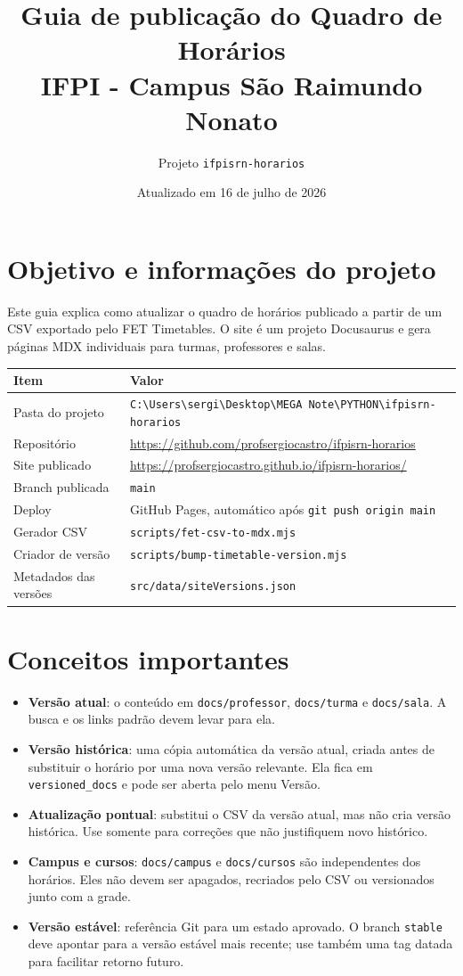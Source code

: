 \documentclass[11pt,a4paper]{article}
\title{\textbf{Guia de publicação do Quadro de Horários}\\\large IFPI - Campus São Raimundo Nonato}
\author{Projeto \texttt{ifpisrn-horarios}}
\date{Atualizado em 16 de julho de 2026}
\begin{document}
\maketitle
\tableofcontents
\newpage

\section{Objetivo e informações do projeto}
Este guia explica como atualizar o quadro de horários publicado a partir de um CSV exportado pelo FET Timetables. O site é um projeto Docusaurus e gera páginas MDX individuais para turmas, professores e salas.

\begin{longtable}{p{}p{}}
\toprule
Item & Valor \\
\midrule
Pasta do projeto & \texttt{C:\textbackslash Users\textbackslash sergi\textbackslash Desktop\textbackslash MEGA Note\textbackslash PYTHON\textbackslash ifpisrn-horarios} \\
Repositório & \url{https://github.com/profsergiocastro/ifpisrn-horarios} \\
Site publicado & \url{https://profsergiocastro.github.io/ifpisrn-horarios/} \\
Branch publicada & \texttt{main} \\
Deploy & GitHub Pages, automático após \texttt{git push origin main} \\
Gerador CSV & \texttt{scripts/fet-csv-to-mdx.mjs} \\
Criador de versão & \texttt{scripts/bump-timetable-version.mjs} \\
Metadados das versões & \texttt{src/data/siteVersions.json} \\
\bottomrule
\end{longtable}

\section{Conceitos importantes}
\begin{itemize}[leftmargin=*]
  \item \textbf{Versão atual}: o conteúdo em \texttt{docs/professor}, \texttt{docs/turma} e \texttt{docs/sala}. A busca e os links padrão devem levar para ela.
  \item \textbf{Versão histórica}: uma cópia automática da versão atual, criada antes de substituir o horário por uma nova versão relevante. Ela fica em \texttt{versioned\_docs} e pode ser aberta pelo menu Versão.
  \item \textbf{Atualização pontual}: substitui o CSV da versão atual, mas não cria versão histórica. Use somente para correções que não justifiquem novo histórico.
  \item \textbf{Campus e cursos}: \texttt{docs/campus} e \texttt{docs/cursos} são independentes dos horários. Eles não devem ser apagados, recriados pelo CSV ou versionados junto com a grade.
  \item \textbf{Versão estável}: referência Git para um estado aprovado. O branch \texttt{stable} deve apontar para a versão estável mais recente; use também uma tag datada para facilitar retorno futuro.
\end{itemize}
\end{document}
